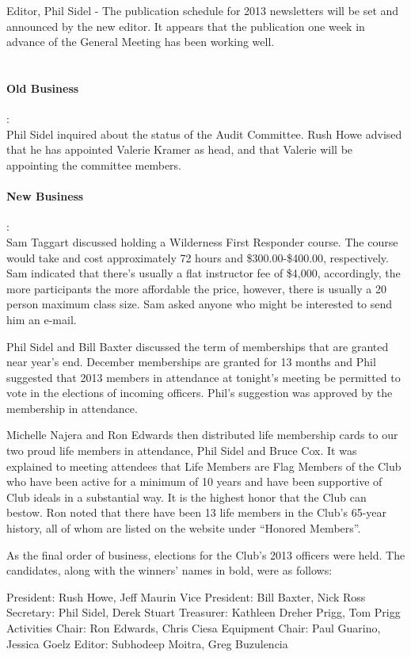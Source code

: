 \documentclass[10pt,a4paper]{article}
\begin{document}
\begin{multicols}{2}
Editor, Phil Sidel - The publication schedule for 2013 newsletters will be set and announced by the new editor.  It appears that the publication one week in advance of the General Meeting has been working well.
\\
\\
\paragraph{Old Business} :
\\
Phil Sidel inquired about the status of the Audit Committee.  Rush Howe advised that he has appointed Valerie Kramer as head, and that Valerie will be appointing the committee members.
\\
\paragraph{New Business} :
\\
Sam Taggart discussed holding a Wilderness First Responder course. The course would take and cost approximately 72 hours and \$300.00-\$400.00, respectively. Sam indicated that there's usually a flat instructor fee of \$4,000, accordingly, the more participants the more affordable the price, however, there is usually a 20 person maximum class size.  Sam asked anyone who might be interested to send him an e-mail.

Phil Sidel and Bill Baxter discussed the term of memberships that are granted near year's end. December memberships are granted for 13 months and Phil suggested that 2013 members in attendance at tonight's meeting be permitted to vote in the elections of incoming officers.  Phil's suggestion was approved by the membership in attendance.

Michelle Najera and Ron Edwards then distributed life membership cards to our two proud life members in attendance, Phil Sidel and Bruce Cox.  It was explained to meeting attendees that Life Members are Flag Members of the Club who have been active for a minimum of 10 years and have been supportive of Club ideals in a substantial way.  It is the highest honor that the Club can bestow.  Ron noted that there have been 13 life members in the Club's 65-year history, all of whom are listed on the website under “Honored Members”.

As the final order of business, elections for the Club's 2013 officers were held.  The candidates, along with the winners' names in bold, were as follows:

President:	Rush Howe, Jeff Maurin
Vice President:	Bill Baxter, Nick Ross
Secretary:	Phil Sidel, Derek Stuart
Treasurer:	Kathleen Dreher Prigg, Tom Prigg
Activities Chair:	Ron Edwards, Chris Ciesa
Equipment Chair:	Paul Guarino, Jessica Goelz
Editor:		Subhodeep Moitra, Greg Buzulencia


\end{multicols}
\end{document}
